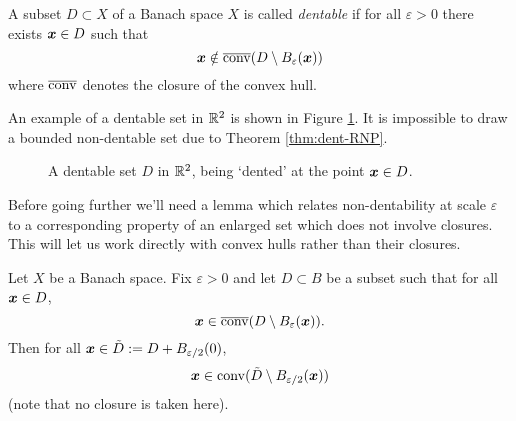 \begin{defn}
  A subset $D \subset X$ of a Banach space $X$ is called \emph{dentable} if for all $\varepsilon > 0$ there exists $\bm{x} \in D$ such that
  \begin{equation*}
    \bm{x} \notin \overline{\mathrm{conv}}(D \setminus B_{\varepsilon}(\bm{x}))
  \end{equation*}
  where $\overline{\mathrm{conv}}$ denotes the closure of the convex hull.
\end{defn}

An example of a dentable set in $\mathbb{R}^{2}$ is shown in Figure \ref{fig:dentable}.
It is impossible to draw a bounded non-dentable set due to Theorem \ref{thm:dent-RNP}. 

\begin{figure}
    \centering
    \def\svgwidth{\columnwidth}
    
    
    \caption{A dentable set $D$ in $\mathbb{R}^{2}$, being `dented' at the point $\bm{x} \in D$.}
    \label{fig:dentable}
\end{figure}

Before going further we'll need a lemma which relates non-dentability at scale $\varepsilon$ to a corresponding property of an enlarged set which does not involve closures.
This will let us work directly with convex hulls rather than their closures.

\begin{lem}\label{lem:dentlem}
  Let $X$ be a Banach space.
  Fix $\varepsilon > 0$ and let $D \subset B$ be a subset such that for all $\bm{x} \in D$,
  \begin{equation}\label{eq:dentlem-ass}
    \bm{x} \in \overline{\mathrm{conv}}(D \setminus B_{\varepsilon}(\bm{x})).
  \end{equation}
  Then for all $\bm{x} \in \tilde{D} := D + B_{\varepsilon/2}(0)$,
  \begin{equation}
    \bm{x} \in \mathrm{conv}(\tilde{D} \setminus B_{\varepsilon/2}(\bm{x}))
  \end{equation}
  (note that no closure is taken here).
\end{lem}

